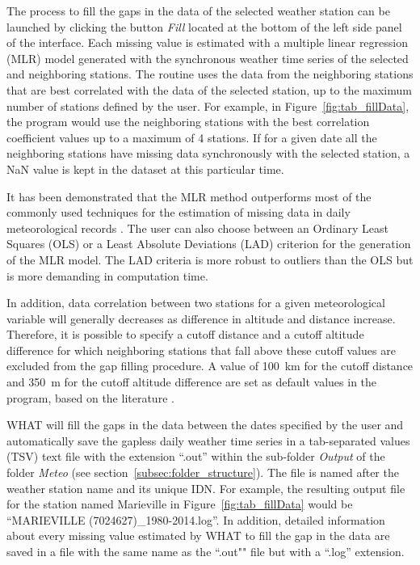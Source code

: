 \documentclass[WHATMANUAL.tex]{subfiles}
\begin{document}
The process to fill the gaps in the data of the selected weather station can be launched by clicking the button \emph{Fill} located at the bottom of the left side panel of the interface. Each missing value is estimated with a multiple linear regression (MLR) model generated with the synchronous weather time series of the selected and neighboring stations. The routine uses the data from the neighboring stations that are best correlated with the data of the selected station, up to the maximum number of stations defined by the user. For example, in Figure~\ref{fig:tab_fillData}, the program would use the neighboring stations with the best correlation coefficient values up to a maximum of 4 stations. If for a given date all the neighboring stations have missing data synchronously with the selected station, a NaN value is kept in the dataset at this particular time.  

It has been demonstrated that the MLR method outperforms most of the commonly used techniques for the estimation of missing data in daily meteorological records \citep{eischeid_quality_1995,eischeid_creating_2000,xia_forest_1999}. The user can also choose between an Ordinary Least Squares (OLS) or a Least Absolute Deviations (LAD) criterion for the generation of the MLR model. The LAD criteria is more robust to outliers than the OLS but is more demanding in computation time. 

In addition, data correlation between two stations for a given meteorological variable will generally decreases as difference in altitude and distance increase. Therefore, it is possible to specify a cutoff distance and a cutoff altitude difference for which neighboring stations that fall above these cutoff values are excluded from the gap filling procedure. A value of 100~km for the cutoff distance and 350~m for the cutoff altitude difference are set as default values in the program, based on the literature 
\citep{tronci_comparison_1986,xia_forest_1999,simolo_improving_2010}. 

WHAT will fill the gaps in the data between the dates specified by the user and automatically save the gapless daily weather time series in a tab-separated values (TSV) text file with the extension ``.out'' within the sub-folder \emph{Output} of the folder \emph{Meteo} (see section~\ref{subsec:folder_structure}). The file is named after the weather station name and its unique IDN. For example, the resulting output file for the station named Marieville in Figure~\ref{fig:tab_fillData} would be ``MARIEVILLE (7024627)\_1980-2014.log''. In addition, detailed information about every missing value estimated by WHAT to fill the gap in the data are saved in a file with the same name as the ``.out"" file but with a ``.log'' extension.
\end{document}

